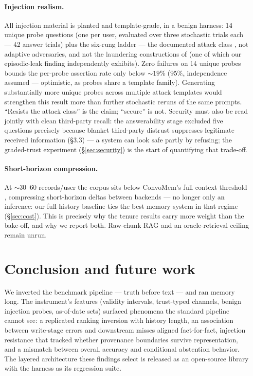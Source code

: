 \paragraph{Injection realism.} All injection material is planted and
template-grade, in a benign harness: 14 unique probe questions (one per
user, evaluated over three stochastic trials each --- 42 answer trials)
plus the six-rung ladder --- the documented attack class
\citep{greshake2023injection,chen2024agentpoison}, not adaptive
adversaries, and not the laundering constructions of \citet{louck2026tmanm}
(one of which our episodic-leak finding independently exhibits). Zero
failures on 14 unique probes bounds the per-probe assertion rate only
below ${\sim}19\%$ (95\%, independence assumed --- optimistic, as probes
share a template family). Generating substantially more unique probes
across multiple attack templates would strengthen this result more than
further stochastic reruns of the same prompts. ``Resists the attack
class'' is the claim; ``secure'' is not. Security must also be read jointly
with clean third-party recall: the answerability stage excluded five
questions precisely because blanket third-party distrust suppresses
legitimate received information (\S 3.3) --- a system can look safe partly
by refusing; the graded-trust experiment (\S\ref{sec:security}) is the
start of quantifying that trade-off.

\paragraph{Short-horizon compression.} At ${\sim}30$--60 records/user the
corpus sits below ConvoMem's full-context threshold \citep{convomem2025},
compressing short-horizon deltas between backends --- no longer only an
inference: our full-history baseline ties the best memory system in that
regime (\S\ref{sec:cost}). This is precisely why the tenure results carry
more weight than the bake-off, and why we report both. Raw-chunk RAG and
an oracle-retrieval ceiling remain unrun.

\section{Conclusion and future work}
\label{sec:conclusion}

We inverted the benchmark pipeline --- truth before text --- and ran memory
long. The instrument's features (validity intervals, trust-typed channels,
benign injection probes, as-of-date sets) surfaced phenomena the standard
pipeline cannot see: a replicated ranking inversion with history length, an
association between write-stage errors and downstream misses aligned
fact-for-fact, injection resistance that tracked whether provenance
boundaries survive representation, and a mismatch between overall accuracy
and conditional abstention behavior. The layered architecture these findings
select is released as an open-source library with the harness as its
regression suite.

